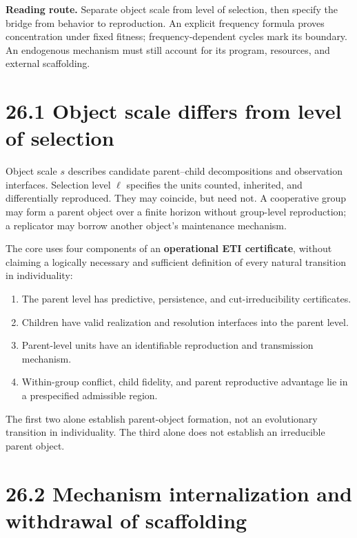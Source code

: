 \documentclass[
  english,
  11pt,
  oneside]{book}
\providecommand{\tightlist}{%
  \setlength{\itemsep}{0pt}\setlength{\parskip}{0pt}}
\begin{document}
\textbf{Reading route.} Separate object scale from level of selection, then specify the bridge from behavior to reproduction. An explicit frequency formula proves concentration under fixed fitness; frequency-dependent cycles mark its boundary. An endogenous mechanism must still account for its program, resources, and external scaffolding.

\section{26.1 Object scale differs from level of selection}\label{object-scale-differs-from-level-of-selection}

Object scale \(s\) describes candidate parent--child decompositions and observation interfaces. Selection level \(\ell\) specifies the units counted, inherited, and differentially reproduced. They may coincide, but need not. A cooperative group may form a parent object over a finite horizon without group-level reproduction; a replicator may borrow another object's maintenance mechanism.

The core uses four components of an \textbf{operational ETI certificate}, without claiming a logically necessary and sufficient definition of every natural transition in individuality:

\begin{enumerate}
\def\labelenumi{\arabic{enumi}.}
\tightlist
\item
  The parent level has predictive, persistence, and cut-irreducibility certificates.
\item
  Children have valid realization and resolution interfaces into the parent level.
\item
  Parent-level units have an identifiable reproduction and transmission mechanism.
\item
  Within-group conflict, child fidelity, and parent reproductive advantage lie in a prespecified admissible region.
\end{enumerate}

The first two alone establish parent-object formation, not an evolutionary transition in individuality. The third alone does not establish an irreducible parent object.

\section{26.2 Mechanism internalization and withdrawal of scaffolding}\label{mechanism-internalization-and-withdrawal-of-scaffolding}
\end{document}

